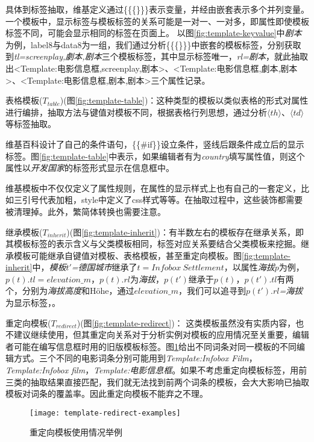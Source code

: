 具体到标签抽取，维基定义通过\{\{\{\}\}\}表示变量，并经由嵌套表示多个并列变量。
一个模板中，显示标签与模板标签的关系可能是一对一、一对多，即属性即使模板标签不同，可能会显示相同的标签在页面上。
以图\ref{fig:template-keyvalue}中\textit{剧本}为例，label8与data8为一组，我们通过分析\{\{\{\}\}\}中嵌套的模板标签，分别获取到\textit{tl=screenplay,劇本,剧本}三个模板标签，其中显示标签唯一，\textit{rl=剧本}，就此抽取出<Template:电影信息框,screenplay,剧本>、<Template:电影信息框,劇本,剧本>、<Template:电影信息框,剧本,剧本>三个属性记录。

{\heiti 表格模板($T_{table}$)(图\ref{fig:template-table})：}这种类型的模板以类似表格的形式对属性进行编排，抽取方法与键值对模板不同，根据表格行列思想，通过分析$\langle th\rangle、\langle td\rangle$等标签抽取。

维基百科设计了自己的条件语句，\{\{\#if\}\}设立条件，竖线后跟条件成立后的显示标签。图\ref{fig:template-table}中表示，如果编辑者有为\textit{country}填写属性值，则这个属性以\textit{开发国家}的标签形式显示在信息框中。

维基模板中不仅仅定义了属性规则，在属性的显示样式上也有自己的一套定义，比如三引号代表加粗，style中定义了css样式等等。在抽取过程中，这些装饰都需要被清理掉。此外，繁简体转换也需要注意。

{\heiti 继承模板($T_{inherit}$)(图\ref{fig:template-inherit})：}有半数左右的模板存在继承关系，即其模板标签的表示含义与父类模板相同，标签对应关系要结合父类模板来挖掘。继承模板可能继承自键值对模板、表格模板，甚至重定向模板。图\ref{fig:template-inherit}中，\textit{模板$t'$=德国城市}继承了\textit{$t = Infobox \ Settlement$}，以属性\textit{海拔}$p$为例，$p(t).tl = elevation\_m$，$p(t).rl$为\textit{海拔}，$p(t')$继承于$p(t)$，$p(t').tl$有两个，分别为\textit{海拔高度}和{Höhe}，通过$elevation\_m$，我们可以追寻到\textit{$p(t').rl$=海拔}为显示标签，。

{\heiti 重定向模板($T_{redirect}$)(图\ref{fig:template-redirect})：} 这类模板虽然没有实质内容，也不建议继续使用，但其重定向关系对于分析实例对模板的应用情况至关重要，编辑者可能在编写信息框时用的旧版模板标签。图\ref{fig:template-redirect-examples}给出不同词条对同一模板的不同编辑方式。三个不同的电影词条分别可能用到\textit{Template:Infobox Film}，\textit{Template:Infobox film}，\textit{Template:电影信息框}。如果不考虑重定向模板标签，用前三类的抽取结果直接匹配，我们就无法找到前两个词条的模板，会大大影响已抽取模板对词条的覆盖率。因此重定向模板不能弃之不理。


\begin{figure}[ht]
  \centering
  \texttt{[image: template-redirect-examples]}
  \caption{重定向模板使用情况举例}
  \label{fig:template-redirect-examples}
\end{figure}


